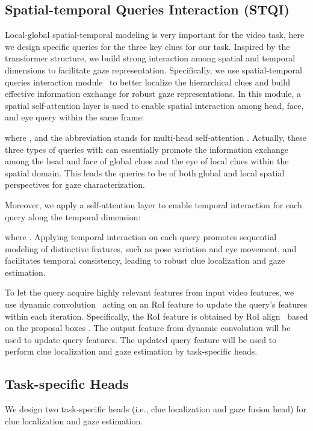 \documentclass[journal]{IEEEtran}
\begin{document}
\subsection{Spatial-temporal Queries Interaction (STQI)}
Local-global spatial-temporal modeling is very important for the video task\cite{local2023,local2020,liang2023local,cycmunet2023}, here we design specific queries for the three key clues for our task. Inspired by the transformer structure, we build strong interaction among spatial and temporal dimensions to facilitate gaze representation. Specifically, we use spatial-temporal queries interaction module~\cite{Tevit} to better localize the hierarchical clues and build effective information exchange for robust gaze representations. In this module, a spatial self-attention layer is used to enable spatial interaction among head, face, and eye query within the same frame:

where , and the abbreviation  stands for multi-head self-attention \cite{attention}. Actually, these three types of queries with  can essentially promote the information exchange among the head and face of global clues and the eye of local clues within the spatial domain. This leads the queries to be of both global and local spatial perspectives for gaze characterization.  


Moreover, we apply a self-attention layer to enable temporal interaction for each query along the temporal dimension:

where . Applying temporal interaction on each query promotes sequential modeling of distinctive features, such as pose variation and eye movement, and facilitates temporal consistency, leading to robust clue localization and gaze estimation.


To let the query acquire highly relevant features from input video features, we use dynamic convolution~\cite{sparse} acting on an RoI feature to update the query's features within each iteration. Specifically, the RoI feature is obtained by RoI align~\cite{maskrcnn} based on the proposal boxes . The output feature from dynamic convolution will be used to update query features. The updated query feature  will be used to perform clue localization and gaze estimation by task-specific heads.

\subsection{Task-specific Heads}
We design two task-specific heads (i.e., clue localization and gaze fusion head) for clue localization and gaze estimation.
\end{document}
